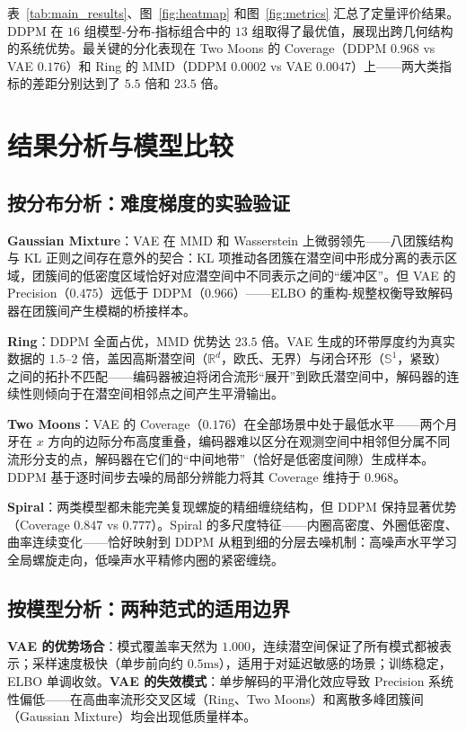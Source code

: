 \documentclass[10pt, a4paper, oneside]{ctexart}
\numberwithin{equation}{section}
\numberwithin{table}{section}
\numberwithin{figure}{section}
\newcommand{\R}{\mathbb{R}}
\begin{document}
表~\ref{tab:main_results}、图~\ref{fig:heatmap} 和图~\ref{fig:metrics} 汇总了定量评价结果。DDPM 在 $16$ 组模型-分布-指标组合中的 $13$ 组取得了最优值，展现出跨几何结构的系统优势。最关键的分化表现在 Two Moons 的 Coverage（DDPM $0.968$ vs VAE $0.176$）和 Ring 的 MMD（DDPM $0.0002$ vs VAE $0.0047$）上——两大类指标的差距分别达到了 $5.5$ 倍和 $23.5$ 倍。

\section{结果分析与模型比较}

\subsection{按分布分析：难度梯度的实验验证}

\textbf{Gaussian Mixture}：VAE 在 MMD 和 Wasserstein 上微弱领先——八团簇结构与 KL 正则之间存在意外的契合：KL 项推动各团簇在潜空间中形成分离的表示区域，团簇间的低密度区域恰好对应潜空间中不同表示之间的“缓冲区”。但 VAE 的 Precision（$0.475$）远低于 DDPM（$0.966$）——ELBO 的重构-规整权衡导致解码器在团簇间产生模糊的桥接样本。

\textbf{Ring}：DDPM 全面占优，MMD 优势达 $23.5$ 倍。VAE 生成的环带厚度约为真实数据的 $1.5$--$2$ 倍，盖因高斯潜空间（$\R^d$，欧氏、无界）与闭合环形（$\mathbb{S}^1$，紧致）之间的拓扑不匹配——编码器被迫将闭合流形“展开”到欧氏潜空间中，解码器的连续性则倾向于在潜空间相邻点之间产生平滑输出。

\textbf{Two Moons}：VAE 的 Coverage（$0.176$）在全部场景中处于最低水平——两个月牙在 $x$ 方向的边际分布高度重叠，编码器难以区分在观测空间中相邻但分属不同流形分支的点，解码器在它们的“中间地带”（恰好是低密度间隙）生成样本。DDPM 基于逐时间步去噪的局部分辨能力将其 Coverage 维持于 $0.968$。

\textbf{Spiral}：两类模型都未能完美复现螺旋的精细缠绕结构，但 DDPM 保持显著优势（Coverage $0.847$ vs $0.777$）。Spiral 的多尺度特征——内圈高密度、外圈低密度、曲率连续变化——恰好映射到 DDPM 从粗到细的分层去噪机制：高噪声水平学习全局螺旋走向，低噪声水平精修内圈的紧密缠绕。

\subsection{按模型分析：两种范式的适用边界}

\textbf{VAE 的优势场合}：模式覆盖率天然为 $1.000$，连续潜空间保证了所有模式都被表示；采样速度极快（单步前向约 $0.5\mathrm{ms}$），适用于对延迟敏感的场景；训练稳定，ELBO 单调收敛。\textbf{VAE 的失效模式}：单步解码的平滑化效应导致 Precision 系统性偏低——在高曲率流形交叉区域（Ring、Two Moons）和离散多峰团簇间（Gaussian Mixture）均会出现低质量样本。
\end{document}
